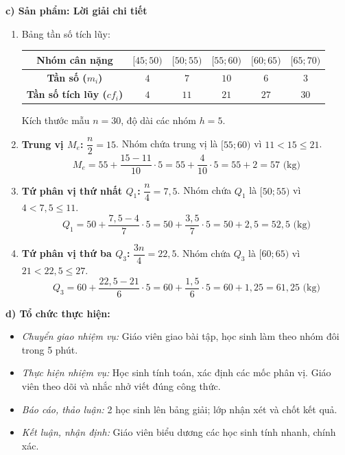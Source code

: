 \documentclass[12pt, a4paper]{article}
\begin{document}
\noindent \textbf{c) Sản phẩm: Lời giải chi tiết}
\begin{enumerate}[leftmargin=0.6cm]
    \item Bảng tần số tích lũy:
    \begin{center}
    \small
    \begin{tabular}{|c|c|c|c|c|c|}
    \hline
    \textbf{Nhóm cân nặng} & $[45; 50)$ & $[50; 55)$ & $[55; 60)$ & $[60; 65)$ & $[65; 70)$ \\ \hline
    \textbf{Tần số ($m_i$)} & $4$ & $7$ & $10$ & $6$ & $3$ \\ \hline
    \textbf{Tần số tích lũy ($cf_i$)} & $4$ & $11$ & $21$ & $27$ & $30$ \\ \hline
    \end{tabular}
    \end{center}
    Kích thước mẫu $n = 30$, độ dài các nhóm $h = 5$.
    \item \textbf{Trung vị $M_e$:}
    $\dfrac{n}{2} = 15$. Nhóm chứa trung vị là $[55; 60)$ vì $11 < 15 \le 21$.
    $$M_e = 55 + \dfrac{15 - 11}{10} \cdot 5 = 55 + \dfrac{4}{10} \cdot 5 = 55 + 2 = 57\text{ (kg)}$$
    \item \textbf{Tứ phân vị thứ nhất $Q_1$:}
    $\dfrac{n}{4} = 7{,}5$. Nhóm chứa $Q_1$ là $[50; 55)$ vì $4 < 7{,}5 \le 11$.
    $$Q_1 = 50 + \dfrac{7{,}5 - 4}{7} \cdot 5 = 50 + \dfrac{3{,}5}{7} \cdot 5 = 50 + 2{,}5 = 52{,}5\text{ (kg)}$$
    \item \textbf{Tứ phân vị thứ ba $Q_3$:}
    $\dfrac{3n}{4} = 22{,}5$. Nhóm chứa $Q_3$ là $[60; 65)$ vì $21 < 22{,}5 \le 27$.
    $$Q_3 = 60 + \dfrac{22{,}5 - 21}{6} \cdot 5 = 60 + \dfrac{1{,}5}{6} \cdot 5 = 60 + 1{,}25 = 61{,}25\text{ (kg)}$$
\end{enumerate}

\noindent \textbf{d) Tổ chức thực hiện:}
\begin{itemize}[leftmargin=0.8cm]
    \item \textit{Chuyển giao nhiệm vụ:} Giáo viên giao bài tập, học sinh làm theo nhóm đôi trong 5 phút.
    \item \textit{Thực hiện nhiệm vụ:} Học sinh tính toán, xác định các mốc phân vị. Giáo viên theo dõi và nhắc nhở viết đúng công thức.
    \item \textit{Báo cáo, thảo luận:} 2 học sinh lên bảng giải; lớp nhận xét và chốt kết quả.
    \item \textit{Kết luận, nhận định:} Giáo viên biểu dương các học sinh tính nhanh, chính xác.
\end{itemize}
\end{document}
